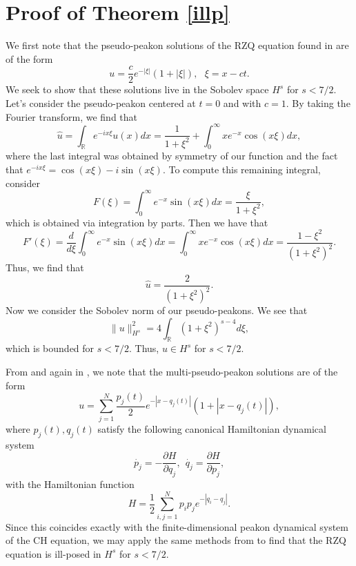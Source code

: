 \documentclass[reqno]{amsart}
\theoremstyle{plain}
\numberwithin{equation}{section}
\newcommand{\p}{\partial}
\newcommand{\rr}{\mathbb{R}}
\newcommand{\wh}{\widehat}
\begin{document}
\section{Proof of Theorem \ref{illp}} 

We first note that the pseudo-peakon solutions of the RZQ equation found in \cite{qr} are of the form
\[
u = \frac{c}{2}e^{-|\xi|}(1+|\xi|), \ \ \ \xi=x-ct.
\]
We seek to show that these solutions live in the Sobolev space $H^s$ for $s<7/2$.  Let's consider the pseudo-peakon centered at $t=0$ and  with $c=1$.  By taking the Fourier transform, we find that
\[
\wh{u} = \int_\rr e^{-ix\xi}u(x)dx = \frac{1}{1+\xi^2}+\int_{0}^\infty xe^{-x}\cos(x\xi)dx,
\]
where the last integral was obtained by symmetry of our function and the fact that $e^{-ix\xi}=\cos(x\xi)-i\sin(x\xi)$.  To compute this remaining integral, consider
\[
F(\xi) = \int_0^\infty e^{-x}\sin(x\xi)dx=\frac{\xi}{1+\xi^2},
\]
which is obtained via integration by parts.  Then we have that
\[
F'(\xi) = \frac{d}{d\xi}\int_0^\infty e^{-x}\sin(x\xi)dx=\int_0^\infty xe^{-x}\cos(x\xi)dx = \frac{1-\xi^2}{(1+\xi^2)^2}.
\]
Thus, we find that
\[
\wh{u} = \frac{2}{(1+\xi^2)^2}.
\]
Now we consider the Sobolev norm of our pseudo-peakons.  We see that
\[
\|u\|_{H^s}^2 = 4\int_\rr(1+\xi^2)^{s-4}d\xi,
\]
which is bounded for $s<7/2$.  Thus, $u \in H^s$ for $s<7/2$.  

From \cite{rzq} and again in \cite{qr}, we note that the multi-pseudo-peakon solutions are of the form
\[
u=\sum_{j=1}^N\frac{p_j(t)}{2}e^{-|x-q_j(t)|}(1+|x-q_j(t)|),
\]
where $p_j(t), q_j(t)$ satisfy the following canonical Hamiltonian dynamical system
\[
\dot{p_j} = -\frac{\p H}{\p q_j}, \ \ \dot{q_j} = \frac{\p H}{\p p_j},
\]
with the Hamiltonian function
\[
H=\frac12\sum_{i,j=1}^N p_ip_je^{-|q_i-q_j|}.
\]
Since this coincides exactly with the finite-dimensional peakon dynamical system of the CH equation, we may apply the same methods from \cite{hhg} to find that the RZQ equation is ill-posed in $H^s$ for $s<7/2$.
\end{document}
